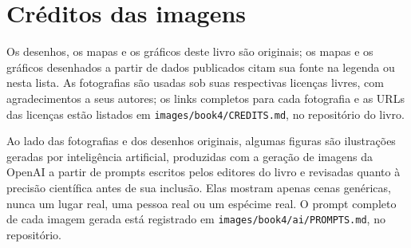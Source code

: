\chapter*{Créditos das imagens}

Os desenhos, os mapas e os gráficos deste livro são originais; os mapas e os
gráficos desenhados a partir de dados publicados citam sua fonte na legenda ou
nesta lista. As fotografias são usadas sob suas respectivas licenças livres, com
agradecimentos a seus autores; os links completos para cada fotografia e as URLs
das licenças estão listados em \texttt{images/book4/CREDITS.md}, no repositório
do livro.

\bigskip
Ao lado das fotografias e dos desenhos originais, algumas figuras são ilustrações
geradas por inteligência artificial, produzidas com a geração de imagens da OpenAI
a partir de prompts escritos pelos editores do livro e revisadas quanto à precisão
científica antes de sua inclusão. Elas mostram apenas cenas genéricas, nunca um
lugar real, uma pessoa real ou um espécime real. O prompt completo de cada imagem
gerada está registrado em \texttt{images/book4/ai/PROMPTS.md}, no repositório.

